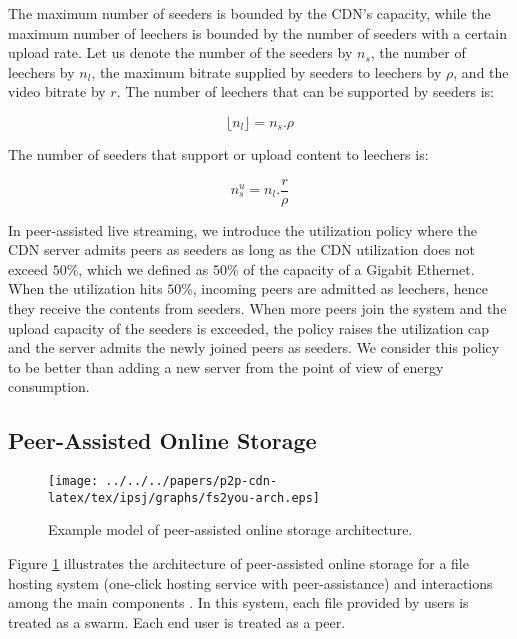 The maximum number of seeders is bounded by the CDN's capacity, while the maximum number of leechers is bounded by the number of seeders with a certain upload rate.
Let us denote the number of the seeders by $n_s$, the number of leechers by $n_l$, the maximum bitrate supplied by seeders to leechers by $\rho$, and the video bitrate by $r$. 
The number of leechers that can be supported by seeders is:

\begin{equation}\label{eqn:leecher}
	\lfloor n_l \rfloor = n_s . \rho
\end{equation}

The number of seeders that support or upload content to leechers is:

\begin{equation}\label{eqn:seeders-to-leechers}
	n_{s}^{u} = n_l . \frac{r}{\rho}
\end{equation}

In peer-assisted live streaming, we introduce the utilization policy where the CDN server admits peers as seeders as long as the CDN utilization does not exceed $50$\%, which we defined as $50$\% of the capacity of a Gigabit Ethernet. 
When the utilization hits $50$\%, incoming peers are admitted as leechers, hence they receive the contents from seeders. 
When more peers join the system and the upload capacity of the seeders is exceeded, the policy raises the utilization cap and the server admits the newly joined peers as seeders. 
We consider this policy to be better than adding a new server from the point of view of energy consumption.

\subsection{Peer-Assisted Online Storage}

\begin{figure}[tb]
\begin{center}
\texttt{[image: ../../../papers/p2p-cdn-latex/tex/ipsj/graphs/fs2you-arch.eps]}
\end{center}
\caption{Example model of peer-assisted online storage architecture.}
\label{fig:fs2you-arch}
\end{figure} 

Figure \ref{fig:fs2you-arch} illustrates the architecture of peer-assisted online storage for a file hosting system (one-click hosting service with peer-assistance) and interactions among the main components \cite{5061997}. 
In this system, each file provided by users is treated as a swarm. Each end user is treated as a peer.

